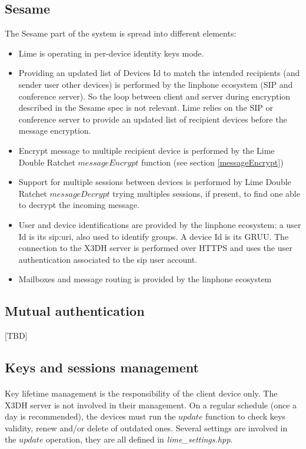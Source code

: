 \documentclass[a4paper,11pt]{article}
\begin{document}
  \subsection{Sesame}
    The Sesame part of the system is spread into different elements:
    \begin{itemize}
      \item Lime is operating in per-device identity keys mode.
      \item Providing an updated list of Devices Id to match the intended recipients (and sender user other devices) is performed by the linphone ecosystem (SIP and conference server). So the loop between client and server during encryption described in the Sesame spec\cite{sesame} is not relevant. Lime relies on the SIP or conference server to provide an updated list of recipient devices before the message encryption.
      \item Encrypt message to multiple recipient device is performed by the Lime Double Ratchet $messageEncrypt$ function (see section \ref{messageEncrypt})
      \item Support for multiple sessions between devices is performed by Lime Double Ratchet $messageDecrypt$ trying multiples sessions, if present, to find one able to decrypt the incoming message.
      \item User and device identifications are provided by the linphone ecosystem: a user Id is its sip:uri, also used to identify groups. A device Id is its GRUU\cite{rfc5627}. The connection to the X3DH server is performed over HTTPS and uses the user authentication associated to the sip user account.
      \item Mailboxes and message routing is provided by the linphone ecosystem
    \end{itemize}
    
  \subsection{Mutual authentication}
    [TBD]
  
  \subsection{Keys and sessions management}
    \paragraph{}Key lifetime management is the responsibility of the client device only. The X3DH server is not involved in their management. On a regular schedule (once a day is recommended), the devices must run the $update$ function to check keys validity, renew and/or delete of outdated ones. Several settings are involved in the $update$ operation, they are all defined in \textit{lime\_settings.hpp}.
    
\end{document}
